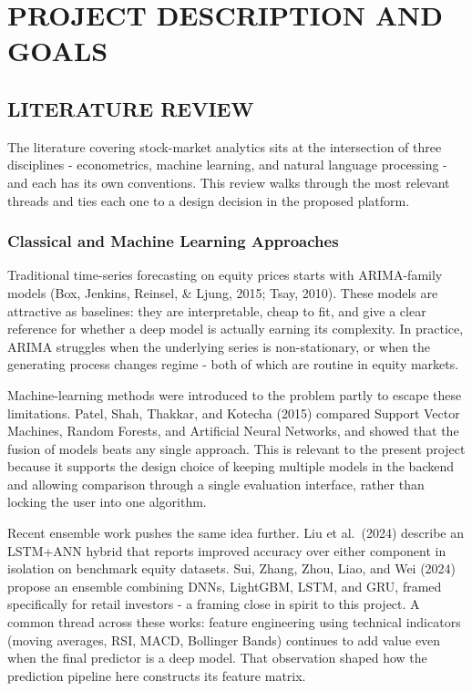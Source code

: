 \documentclass[12pt,a4paper]{report}
\numberwithin{equation}{chapter}
\begin{document}
\chapter{PROJECT DESCRIPTION AND GOALS}

\section{LITERATURE REVIEW}

The literature covering stock-market analytics sits at the intersection of three disciplines - econometrics, machine learning, and natural language processing - and each has its own conventions. This review walks through the most relevant threads and ties each one to a design decision in the proposed platform.

\subsection{Classical and Machine Learning Approaches}

Traditional time-series forecasting on equity prices starts with ARIMA-family models (Box, Jenkins, Reinsel, \& Ljung, 2015; Tsay, 2010). These models are attractive as baselines: they are interpretable, cheap to fit, and give a clear reference for whether a deep model is actually earning its complexity. In practice, ARIMA struggles when the underlying series is non-stationary, or when the generating process changes regime - both of which are routine in equity markets.

Machine-learning methods were introduced to the problem partly to escape these limitations. Patel, Shah, Thakkar, and Kotecha (2015) compared Support Vector Machines, Random Forests, and Artificial Neural Networks, and showed that the fusion of models beats any single approach. This is relevant to the present project because it supports the design choice of keeping multiple models in the backend and allowing comparison through a single evaluation interface, rather than locking the user into one algorithm.

Recent ensemble work pushes the same idea further. Liu et al.\ (2024) describe an LSTM+ANN hybrid that reports improved accuracy over either component in isolation on benchmark equity datasets. Sui, Zhang, Zhou, Liao, and Wei (2024) propose an ensemble combining DNNs, LightGBM, LSTM, and GRU, framed specifically for retail investors - a framing close in spirit to this project. A common thread across these works: feature engineering using technical indicators (moving averages, RSI, MACD, Bollinger Bands) continues to add value even when the final predictor is a deep model. That observation shaped how the prediction pipeline here constructs its feature matrix.
\end{document}
